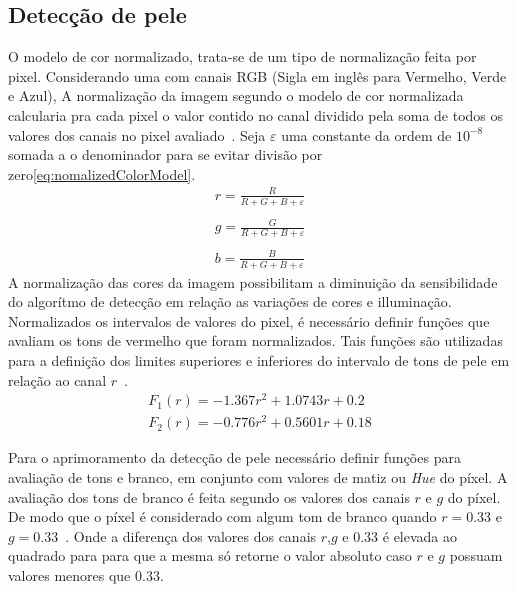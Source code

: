 \documentclass[journal,onecolumn]{IEEEtran}
\begin{document}
	\subsection{Detecção de pele}
	\label{subsec:deteccaoPele}
	O modelo de cor normalizado, trata-se de um tipo de normalização feita por pixel. 
	Considerando uma com canais RGB (Sigla em inglês para Vermelho, Verde e Azul), 
	A normalização da imagem segundo o modelo de cor normalizada calcularia pra cada pixel o valor contido no canal dividido pela soma de todos os valores dos canais no pixel avaliado~\cite{chen2007simple,loesdau2017chromatic}. 
	Seja $\varepsilon$ uma constante da ordem de $10^{-8}$ somada a o denominador para se evitar divisão por zero\eqref{eq:nomalizedColorModel}.	
	\begin{equation}
		\begin{split}
			r  = \frac{R}{R+G+B+\varepsilon} \\\\
			g  = \frac{G}{R+G+B+\varepsilon} \\\\
			b  = \frac{B}{R+G+B+\varepsilon}
			\label{eq:nomalizedColorModel}
		\end{split}
	\end{equation}		
	A normalização das cores da imagem possibilitam a diminuição da sensibilidade do algorítmo de detecção em relação as variações de cores e illuminação.
	Normalizados os intervalos de valores do pixel, é necessário definir funções que avaliam os tons de vermelho  que foram normalizados.
	Tais funções são utilizadas para a definição dos limites superiores e inferiores do intervalo de tons de pele em relação ao canal $r$~\cite{soriano2000using,chen2007simple}.
	\begin{equation}
		\begin{split}
			F_1(r)  = -1.367r^2 + 1.0743r + 0.2 \\
			F_2(r)  = -0.776r^2 + 0.5601r + 0.18
		\end{split}
	\end{equation}
	
	Para o aprimoramento da detecção de pele necessário definir funções para avaliação de tons e branco, em conjunto com valores de matiz ou \textit{Hue} do píxel.
	A avaliação dos tons de branco é feita segundo os valores dos canais $r$ e $g$ do píxel. 
	De modo que o píxel é considerado com algum tom de branco quando $r=0.33$ e $g=0.33$~\cite{chen2007simple}.
	Onde a diferença dos valores dos canais $r$,$g$ e $0.33$ é elevada ao quadrado para para que a mesma só retorne o valor absoluto caso $r$ e $g$ possuam valores menores que $0.33$.
	
\end{document}
